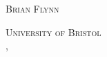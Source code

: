 \begin{titlepage}
{    }%
    \HRule %
    \vspace{1.5cm}
    
    \textsc{\Huge Brian Flynn}%
    
    \vspace{3cm}
    \textsc{
        \LARGE University of Bristol \\    
    }
    \vspace{1cm}
    {\Large \monthname, \the\year}\\[1cm] %
    
    \end{titlepage}
